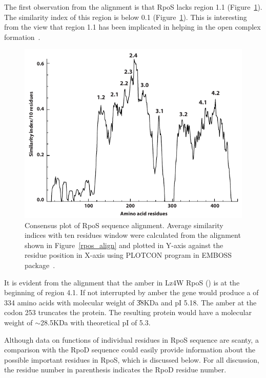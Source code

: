 The first observation from the alignment is that RpoS lacks region
1.1 (Figure~\ref{plotcon}). The similarity index of this region is
below 0.1 (Figure~\ref{plotcon}). This is interesting from the
view that region 1.1 has been implicated in helping in the open
complex formation~\citep[][see also
Section~\ref{region1_1}]{Young2002}.


\begin{figure}[htbp]
\centering
\includegraphics{figures/chap4_plotcon}
\caption[Consensus plot of RpoS sequence alignment]{Consensus plot
of RpoS sequence alignment. Average similarity indices with ten
residues window were calculated from the alignment shown in
Figure~\ref{rpos_align} and plotted in Y-axis against the residue
position in X-axis using PLOTCON program in EMBOSS
package~\citep{Rice2000}.} \label{plotcon}
\end{figure}

It is evident from the alignment that the amber in Lz4W RpoS
(\Lzsigs{}) is at the beginning of region 4.1. If not interrupted
by amber the gene would produce a \sigs{} of 334 amino acids with
molecular weight of \U{38}{KDa} and pI 5.18. The amber at the
codon 253 truncates the protein. The resulting protein would have
a molecular weight of \U{$\sim$28.5}{KDa} with theoretical pI of
5.3.

Although data on functions of individual residues in RpoS sequence
are scanty, a comparison with the RpoD sequence could easily
provide information about the possible important residues in RpoS,
which is discussed below. For all discussion, the residue number
in parenthesis indicates the RpoD residue number.

